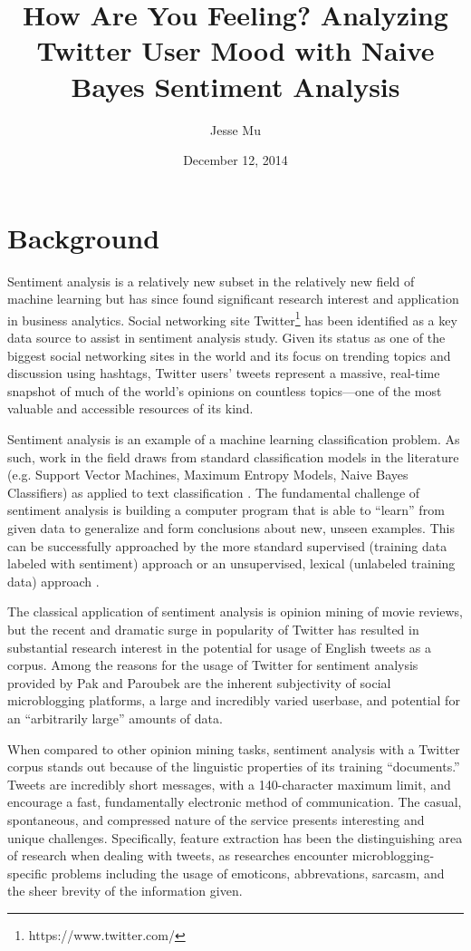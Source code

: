 \documentclass[letter,12pt]{article}
\begin{document}
\title{How Are You Feeling? Analyzing Twitter User Mood with Naive Bayes
Sentiment Analysis}
\date{December 12, 2014}
\author{Jesse Mu}
\maketitle

\section{Background}

Sentiment analysis is a relatively new subset in the relatively new field of
machine learning but has since found significant research interest and
application in business analytics. Social networking site
Twitter\footnote{https://www.twitter.com/} has been identified as a key data
source to assist in sentiment analysis study. Given its status as one of the
biggest social networking sites in the world and its focus on trending topics
and discussion using hashtags, Twitter users' tweets represent a massive,
real-time snapshot of much of the world's opinions on countless topics---one of
the most valuable and accessible resources of its kind.

Sentiment analysis is an example of a machine learning classification problem.
As such, work in the field draws from standard classification models in the
literature (e.g. Support Vector Machines, Maximum Entropy Models, Naive Bayes
Classifiers) as applied to text classification \cite{pang02}. The fundamental
challenge of sentiment analysis is building a computer program that is able to
``learn'' from given data to generalize and form conclusions about new, unseen
examples. This can be successfully approached by the more standard supervised
(training data labeled with sentiment) approach or an unsupervised, lexical
(unlabeled training data) approach \cite{turney02}.

The classical application of sentiment analysis is opinion mining of movie
reviews, but the recent and dramatic surge in popularity of Twitter has
resulted in substantial research interest in the potential for usage of English
tweets as a corpus. Among the reasons for the usage of Twitter for sentiment
analysis provided by Pak and Paroubek \cite{pak10} are the inherent
subjectivity of social microblogging platforms, a large and incredibly varied
userbase, and potential for an ``arbitrarily large'' amounts of data.

When compared to other opinion mining tasks, sentiment analysis with a Twitter
corpus stands out because of the linguistic properties of its training
``documents.'' Tweets are incredibly short messages, with a 140-character
maximum limit, and encourage a fast, fundamentally electronic method of
communication. The casual, spontaneous, and compressed nature of the service
presents interesting and unique challenges. Specifically, feature extraction
has been the distinguishing area of research when dealing with tweets, as
researches encounter microblogging-specific problems including the usage of
emoticons, abbrevations, sarcasm, and the sheer brevity of the information
given.
\end{document}
